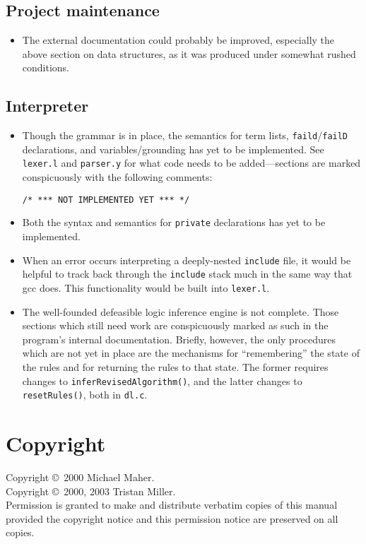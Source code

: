 \documentclass[a4paper,10pt,twocolumn]{article}
\begin{document}
\subsection{Project maintenance}

\begin{itemize}
  
\item The external documentation could probably be improved,
  especially the above section on data structures, as it was produced
  under somewhat rushed conditions.

\end{itemize}

\subsection{Interpreter}

\begin{itemize}
  
\item Though the grammar is in place, the semantics for term lists,
  \texttt{faild}/\texttt{failD} declarations, and variables/grounding has yet to be
  implemented. See \texttt{lexer.l} and \texttt{parser.y} for what
  code needs to be added---sections are marked conspicuously with the
  following comments:
\begin{verbatim}
/* *** NOT IMPLEMENTED YET *** */
\end{verbatim}  
  
\item Both the syntax and semantics for \texttt{private} declarations
  has yet to be implemented.
  
\item When an error occurs interpreting a deeply-nested
  \texttt{include} file, it would be helpful to track back through the
  \texttt{include} stack much in the same way that gcc does. This
  functionality would be built into \texttt{lexer.l}.
       
\item The well-founded defeasible logic inference engine is not
  complete. Those sections which still need work are conspicuously
  marked as such in the program's internal documentation. Briefly,
  however, the only procedures which are not yet in place are the
  mechanisms for ``remembering'' the state of the rules and for
  returning the rules to that state. The former requires changes to
  \texttt{inferRevisedAlgorithm()}, and the latter changes to
  \texttt{resetRules()}, both in \texttt{dl.c}.

\end{itemize}

\appendix

\section{Copyright}

Copyright \copyright~2000 Michael Maher.\\
Copyright \copyright~2000, 2003 Tristan Miller.\\

\noindent Permission is granted to make and distribute verbatim copies of this
manual provided the copyright notice and this permission notice are
preserved on all copies.
\end{document}
